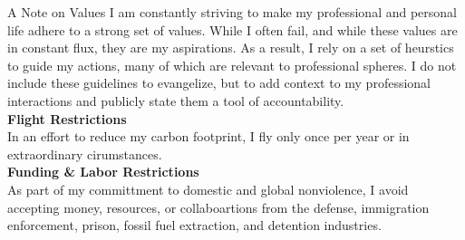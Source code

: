 \documentclass{resume} %
\begin{document}
\vfill

\begin{rSection}{A Note on Values}
I am constantly striving to make my professional and personal life adhere to a strong set of values. While I often fail, and while these values are in constant flux, they are my aspirations. As a result, I rely on a set of heurstics to guide my actions, many of which are relevant to professional spheres. I do not include these guidelines to evangelize, but to add context to my professional interactions and publicly state them a tool of accountability. \\

{\bf Flight Restrictions} \\  
In an effort to reduce my carbon footprint, I fly only once per year or in extraordinary cirumstances. \\

{\bf Funding \& Labor Restrictions} \\
As part of my committment to domestic and global nonviolence, I avoid accepting money, resources, or collaboartions from the defense, immigration enforcement, prison, fossil fuel extraction, and detention industries. \\


\end{rSection}





\end{document}
